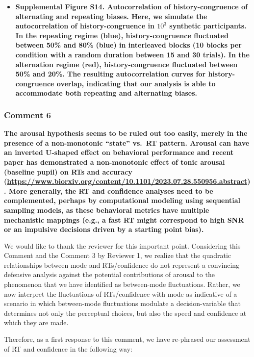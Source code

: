 \documentclass[
]{article}
\providecommand{\tightlist}{%
  \setlength{\itemsep}{0pt}\setlength{\parskip}{0pt}}
\begin{document}
\begin{itemize}
\tightlist
\item
  \textbf{Supplemental Figure S14. Autocorrelation of history-congruence
  of alternating and repeating biases. Here, we simulate the
  autocorrelation of history-congruence in \ensuremath{10^{3}} synthetic
  participants. In the repeating regime (blue), history-congruence
  fluctuated between 50\% and 80\% (blue) in interleaved blocks (10
  blocks per condition with a random duration between 15 and 30 trials).
  In the alternation regime (red), history-congruence fluctuated between
  50\% and 20\%. The resulting autocorrelation curves for
  history-congruence overlap, indicating that our analysis is able to
  accommodate both repeating and alternating biases.}
\end{itemize}

\hypertarget{comment-6-1}{%
\subsubsection{Comment 6}\label{comment-6-1}}

\textbf{The arousal hypothesis seems to be ruled out too easily, merely
in the presence of a non-monotonic ``state'' vs.~RT pattern. Arousal can
have an inverted U-shaped effect on behavioral performance and recent
paper has demonstrated a non-monotonic effect of tonic arousal (baseline
pupil) on RTs and accuracy
(\url{https://www.biorxiv.org/content/10.1101/2023.07.28.550956.abstract}).
More generally, the RT and confidence analyses need to be complemented,
perhaps by computational modeling using sequential sampling models, as
these behavioral metrics have multiple mechanistic mappings (e.g., a
fast RT might correspond to high SNR or an impulsive decisions driven by
a starting point bias).}

We would like to thank the reviewer for this important point.
Considering this Comment and the Comment 3 by Reviewer 1, we realize
that the quadratic relationships between mode and RTs/confidence do not
represent a convincing defensive analysis against the potential
contributions of arousal to the phenomenon that we have identified as
between-mode fluctuations. Rather, we now interpret the fluctuations of
RTs/confidence with mode as indicative of a scenario in which
between-mode fluctuations modulate a decision-variable that determines
not only the perceptual choices, but also the speed and confidence at
which they are made.

Therefore, as a first response to this comment, we have re-phrased our
assessment of RT and confidence in the following way:
\end{document}
